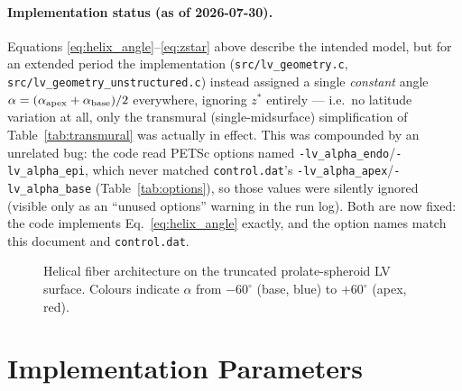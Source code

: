 \documentclass[11pt,a4paper]{article}
\begin{document}
\paragraph{Implementation status (as of 2026-07-30).} Equations
\eqref{eq:helix_angle}--\eqref{eq:zstar} above describe the intended model,
but for an extended period the implementation (\texttt{src/lv\_geometry.c},
\texttt{src/lv\_geometry\_unstructured.c}) instead assigned a single
\emph{constant} angle $\alpha = (\alpha_{\rm apex}+\alpha_{\rm base})/2$
everywhere, ignoring $z^*$ entirely — i.e.\ no latitude variation at all,
only the transmural (single-midsurface) simplification of
Table~\ref{tab:transmural} was actually in effect. This was compounded by
an unrelated bug: the code read PETSc options named
\texttt{-lv\_alpha\_endo}/\texttt{-lv\_alpha\_epi}, which never matched
\texttt{control.dat}'s \texttt{-lv\_alpha\_apex}/\texttt{-lv\_alpha\_base}
(Table~\ref{tab:options}), so those values were silently ignored (visible
only as an ``unused options'' warning in the run log). Both are now fixed:
the code implements Eq.~\eqref{eq:helix_angle} exactly, and the option names
match this document and \texttt{control.dat}.

\begin{figure}[h]
\centering
\caption{Helical fiber architecture on the truncated prolate-spheroid LV
surface. Colours indicate $\alpha$ from $-60^\circ$ (base, blue) to
$+60^\circ$ (apex, red).}
\label{fig:fiber_schematic}
\end{figure}

\section{Implementation Parameters}
\end{document}
